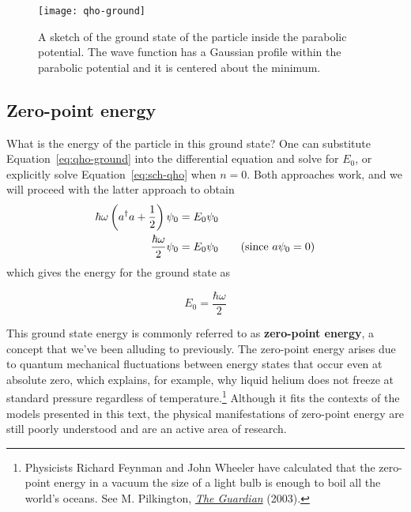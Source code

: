 \begin{figure}[!h]
	\centering
	\texttt{[image: qho-ground]}
	\caption{A sketch of the ground state of the particle inside the parabolic potential. The wave function has a Gaussian profile within the parabolic potential and it is centered about the minimum.}
	\label{fig:qho-ground}
\end{figure}


\subsection{Zero-point energy}
What is the energy of the particle in this ground state? One can substitute Equation~\ref{eq:qho-ground} into the differential equation and solve for $E_0$, or explicitly solve Equation~\ref{eq:sch-qho} when $n=0$. Both approaches work, and we will proceed with the latter approach to obtain
\begin{align*}
	\hbar\omega \left(a^{\dagger} a + \frac{1}{2} \right)\psi_0 &= E_0\psi_0 \\
	\frac{\hbar\omega}{2}\psi_0 &= E_0\psi_0 \tag{since $a\psi_0=0$}
\end{align*}
which gives the energy for the ground state as
\begin{tcolorbox}[title = Zero-point energy] \vspace{-2ex}
	\begin{equation}
		E_0 = \frac{\hbar\omega}{2} \label{eq:zpe}
	\end{equation}
\end{tcolorbox}

This ground state energy is commonly referred to as \textbf{zero-point energy}, a concept that we've been alluding to previously. The zero-point energy arises due to quantum mechanical fluctuations between energy states that occur even at absolute zero, which explains, for example, why liquid helium does not freeze at standard pressure regardless of temperature.\footnote{Physicists Richard Feynman and John Wheeler have calculated that the zero-point energy in a vacuum the size of a light bulb is enough to boil all the world's oceans. See M. Pilkington, \href{https://www.theguardian.com/education/2003/jul/17/research.highereducation}{\emph{The Guardian}} (2003).} Although it fits the contexts of the models presented in this text, the physical manifestations of zero-point energy are still poorly understood and are an active area of research. \par 

